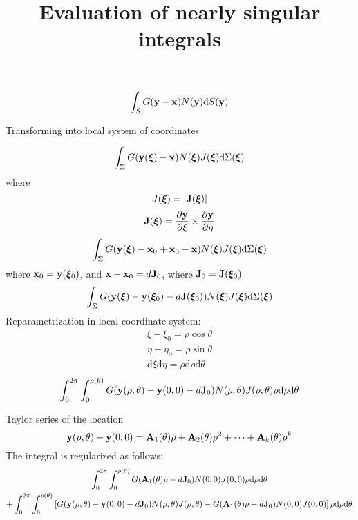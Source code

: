 \documentclass{article}
\title{Evaluation of nearly singular integrals}
\newcommand{\td}{\mathrm{d}}
\begin{document}
\begin{equation}
	\int_{S} G({\bf y} - {\bf x}) N({\bf y}) \td S({\bf y})
\end{equation}

Transforming into local system of coordinates

\begin{equation}
	\int_{\Sigma} G({\bf y(\bm{\xi})} - {\bf x}) N(\bm{\xi}) J(\bm{\xi}) \td \Sigma(\bm{\xi})
\end{equation}
%
where
%
\begin{equation}
	J({\bm{\xi}}) = |\bf{J}(\bm{\xi})|
\end{equation}
%
\begin{equation}
	{\bf J}(\bm{\xi}) = \frac{\partial {\bf y}}{\partial \xi} \times \frac{\partial {\bf y}}{\partial \eta}
\end{equation}
%
\begin{equation}
	\int_{\Sigma} G({\bf y(\bm{\xi})} - {\bf x}_0 + {\bf x}_0 - {\bf x}) N(\bm{\xi}) J(\bm{\xi}) \td \Sigma(\bm{\xi})
\end{equation}
%
where ${\bf x}_0 = {\bf y}(\bm{\xi}_0)$,
and ${\bf x} - {\bf x}_0 = d {\bf J}_0$, 
where ${\bf J}_0 = {\bf J}({\bm{\xi}_0})$
%
\begin{equation}
	\int_{\Sigma}
	G({\bf y(\bm{\xi})} - {\bf y}(\bm{\xi}_0) - d {\bf J}({\bm{\xi}_0})) N(\bm{\xi}) J(\bm{\xi}) \td \Sigma(\bm{\xi})
\end{equation}
%
Reparametrization in local coordinate system:
%
\begin{align}
	\xi - \xi_0 = \rho \cos \theta \\
	\eta - \eta_0 = \rho \sin \theta \\
	\td\xi \td \eta = \rho \td \rho \td \theta
\end{align}
%
\begin{equation}
	\int_{0}^{2\pi}
	\int_{0}^{\rho(\theta)}
	G({\bf y}(\rho, \theta) - {\bf y}(0, 0) - d {\bf J}_0)
	N(\rho, \theta)
	J(\rho, \theta)
	\rho
	\td \rho
	\td \theta
\end{equation}

Taylor series of the location
%
\begin{equation}
{\bf y}(\rho, \theta) - {\bf y}(0, 0) = {\bf A}_1(\theta) \rho + {\bf A}_2(\theta) \rho^2 + \dots + {\bf A}_k(\theta) \rho^k
\end{equation}
%
The integral is regularized as follows:
%
\begin{multline}
	\int_{0}^{2\pi}
	\int_{0}^{\rho(\theta)}
		G({\bf A}_1(\theta) \rho - d {\bf J}_0)
		N(0, 0)
		J(0, 0)
	\rho
	\td \rho
	\td \theta \\
	+
	\int_{0}^{2\pi}
	\int_{0}^{\rho(\theta)}
	\left[
		G({\bf y}(\rho, \theta) - {\bf y}(0, 0) - d {\bf J}_0)
		N(\rho, \theta)
		J(\rho, \theta)
		-
		G({\bf A}_1(\theta) \rho - d {\bf J}_0)
		N(0, 0)
		J(0, 0)
	\right]
	\rho
	\td \rho
	\td \theta
\end{multline}
\end{document}
